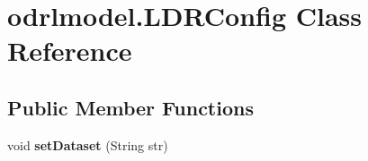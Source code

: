 \hypertarget{classodrlmodel_1_1_l_d_r_config}{\section{odrlmodel.\-L\-D\-R\-Config Class Reference}
\label{classodrlmodel_1_1_l_d_r_config}
}
\subsection*{Public Member Functions}
\begin{DoxyCompactItemize}
\item 
\hypertarget{classodrlmodel_1_1_l_d_r_config_a0b0b9c8d753bad13072439d9ab6b4c19}{void {\bfseries set\-Dataset} (String str)}\label{classodrlmodel_1_1_l_d_r_config_a0b0b9c8d753bad13072439d9ab6b4c19}

\end{DoxyCompactItemize}
